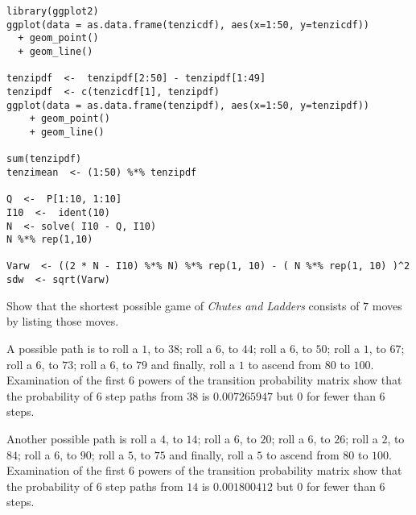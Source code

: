 \documentclass[12pt]{article}
\begin{document}
\begin{solution}
\begin{verbatim}
library(ggplot2)
ggplot(data = as.data.frame(tenzicdf), aes(x=1:50, y=tenzicdf))
  + geom_point()
  + geom_line()

tenzipdf  <-  tenzipdf[2:50] - tenzipdf[1:49]
tenzipdf  <- c(tenzicdf[1], tenzipdf)
ggplot(data = as.data.frame(tenzipdf), aes(x=1:50, y=tenzipdf))
    + geom_point()
    + geom_line()

sum(tenzipdf)
tenzimean  <- (1:50) %*% tenzipdf

Q  <-  P[1:10, 1:10]
I10  <-  ident(10)
N  <- solve( I10 - Q, I10)
N %*% rep(1,10)

Varw  <- ((2 * N - I10) %*% N) %*% rep(1, 10) - ( N %*% rep(1, 10) )^2
sdw  <- sqrt(Varw)
\end{verbatim}
\end{solution}

\begin{exercise}
    Show that the shortest possible game of \emph{Chutes and Ladders}
    consists of \( 7 \) moves by listing those moves.
\end{exercise}
\begin{solution}
    A possible path is to roll a \( 1 \), to \( 38 \); roll a \( 6 \),
    to \( 44 \); roll a \( 6 \), to \( 50 \); roll a \( 1 \), to \( 67 \);
    roll a \( 6 \), to \( 73 \); roll a \( 6 \), to \( 79 \) and
    finally, roll a \( 1 \) to ascend from \( 80 \) to \( 100 \).
    Examination of the first \( 6 \) powers of the transition
    probability matrix show that the probability of \( 6 \) step paths
    from \( 38 \) is \( 0.007265947 \) but \( 0 \) for fewer than \( 6 \)
    steps.

    Another possible path is roll a \( 4 \), to \( 14 \); roll a \( 6 \),
    to \( 20 \); roll a \( 6 \), to \( 26 \); roll a \( 2 \), to \( 84 \);
    roll a \( 6 \), to \( 90 \); roll a \( 5 \), to \( 75 \) and
    finally, roll a \( 5 \) to ascend from \( 80 \) to \( 100 \).
    Examination of the first \( 6 \) powers of the transition
    probability matrix show that the probability of \( 6 \) step paths
    from \( 14 \) is \( 0.001800412 \) but \( 0 \) for fewer than \( 6 \)
    steps.
\end{solution}
\end{document}
